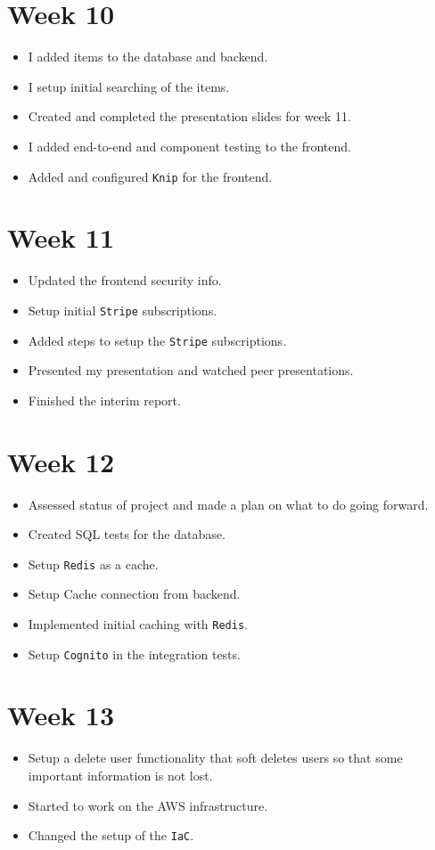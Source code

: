 \documentclass[]{project_report}
\begin{document}
\section{Week 10}
\begin{itemize}
    \item I added items to the database and backend.
    \item I setup initial searching of the items.
    \item Created and completed the presentation slides for week 11.
    \item I added end-to-end and component testing to the frontend.
    \item Added and configured \texttt{Knip} for the frontend.
\end{itemize}

\section{Week 11}
\begin{itemize}
    \item Updated the frontend security info.
    \item Setup initial \texttt{Stripe} subscriptions.
    \item Added steps to setup the \texttt{Stripe} subscriptions.
    \item Presented my presentation and watched peer presentations.
    \item Finished the interim report.
\end{itemize}

\section{Week 12}
\begin{itemize}
    \item Assessed status of project and made a plan on what to do going forward.
    \item Created SQL tests for the database.
    \item Setup \texttt{Redis} as a cache.
    \item Setup Cache connection from backend.
    \item Implemented initial caching with \texttt{Redis}.
    \item Setup \texttt{Cognito} in the integration tests.
\end{itemize}

\section{Week 13}
\begin{itemize}
    \item Setup a delete user functionality that soft deletes users so that some important information is not lost.
    \item Started to work on the AWS infrastructure.
    \item Changed the setup of the \texttt{IaC}.
\end{itemize}
\end{document}
